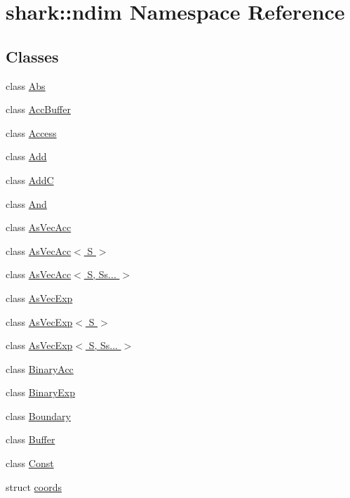 \hypertarget{namespaceshark_1_1ndim}{}\section{shark\+:\+:ndim Namespace Reference}
\label{namespaceshark_1_1ndim}
\subsection*{Classes}
\begin{DoxyCompactItemize}
\item 
class \hyperlink{classshark_1_1ndim_1_1_abs}{Abs}
\item 
class \hyperlink{classshark_1_1ndim_1_1_acc_buffer}{Acc\+Buffer}
\item 
class \hyperlink{classshark_1_1ndim_1_1_access}{Access}
\item 
class \hyperlink{classshark_1_1ndim_1_1_add}{Add}
\item 
class \hyperlink{classshark_1_1ndim_1_1_add_c}{AddC}
\item 
class \hyperlink{classshark_1_1ndim_1_1_and}{And}
\item 
class \hyperlink{classshark_1_1ndim_1_1_as_vec_acc}{As\+Vec\+Acc}
\item 
class \hyperlink{classshark_1_1ndim_1_1_as_vec_acc_3_01_s_01_4}{As\+Vec\+Acc$<$ S $>$}
\item 
class \hyperlink{classshark_1_1ndim_1_1_as_vec_acc_3_01_s_00_01_ss_8_8_8_01_4}{As\+Vec\+Acc$<$ S, Ss... $>$}
\item 
class \hyperlink{classshark_1_1ndim_1_1_as_vec_exp}{As\+Vec\+Exp}
\item 
class \hyperlink{classshark_1_1ndim_1_1_as_vec_exp_3_01_s_01_4}{As\+Vec\+Exp$<$ S $>$}
\item 
class \hyperlink{classshark_1_1ndim_1_1_as_vec_exp_3_01_s_00_01_ss_8_8_8_01_4}{As\+Vec\+Exp$<$ S, Ss... $>$}
\item 
class \hyperlink{classshark_1_1ndim_1_1_binary_acc}{Binary\+Acc}
\item 
class \hyperlink{classshark_1_1ndim_1_1_binary_exp}{Binary\+Exp}
\item 
class \hyperlink{classshark_1_1ndim_1_1_boundary}{Boundary}
\item 
class \hyperlink{classshark_1_1ndim_1_1_buffer}{Buffer}
\item 
class \hyperlink{classshark_1_1ndim_1_1_const}{Const}
\item 
struct \hyperlink{structshark_1_1ndim_1_1coords}{coords}

\end{DoxyCompactItemize}
